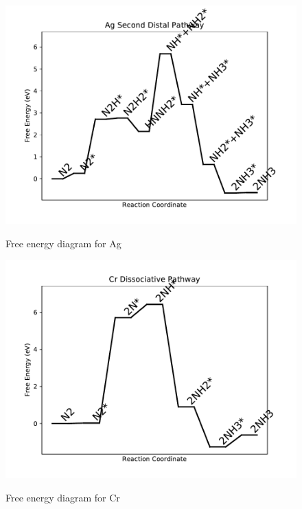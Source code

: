 \documentclass{article}
\begin{document}
\begin{figure}
\includegraphics[width=1\linewidth]{data/plots/Ag_distal_2.pdf}
\label{fig:Ag_distal_2}
\caption{Free energy diagram for Ag}
\end{figure}

\clearpage
\begin{figure}
\includegraphics[width=1\linewidth]{data/plots/Cr_dissociative.pdf}
\label{fig:Cr_dissociative}
\caption{Free energy diagram for Cr}
\end{figure}
\end{document}
